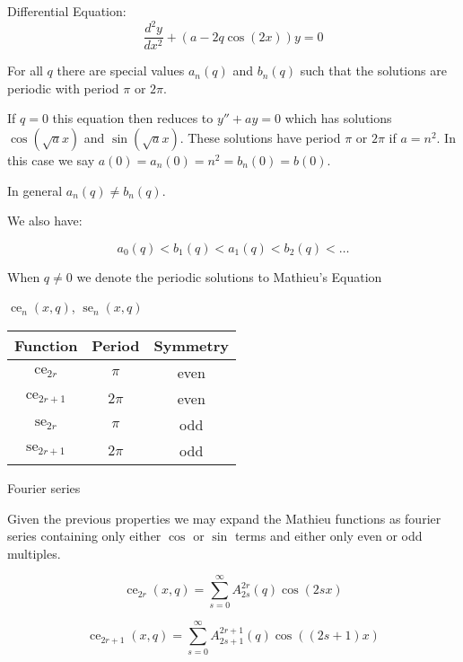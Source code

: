\documentclass{article}
\DeclareMathOperator{\ce}{ce}
\DeclareMathOperator{\se}{se}
\begin{document}
Differential Equation:
\begin{equation}
    \frac{d^2y}{dx^2} + (a - 2q\cos(2x))y = 0
\end{equation}

For all $q$ there are special values $a_n(q)$ and $b_n(q)$ such that the solutions are periodic with period $\pi$ or $2\pi$.

If $q=0$ this equation then reduces to $y'' + ay = 0$ which has solutions $\cos(\sqrt{a}x)$ and $\sin(\sqrt{a}x)$. These solutions have period $\pi$ or $2\pi$ if $a = n^2$. In this case we say $a(0) = a_n(0) = n^2 = b_n(0)=b(0)$. 

In general $a_n(q) \neq b_n(q)$.

We also have:

\begin{equation}
    a_0(q) < b_1(q) < a_1(q) < b_2(q) < \dots
\end{equation}

When $q \neq 0$ we denote the periodic solutions to Mathieu's Equation
\begin{center}
    $\ce_n(x, q)$, $\se_n(x, q)$   
\end{center}

\begin{center}
    \begin{tabular}{|c|c|c|}
    \hline
    Function & Period & Symmetry \\ \hline
    $\ce_{2r}$ & $\pi$ & even \\ \hline
    $\ce_{2r+1}$ & $2\pi$ & even \\ \hline
    $\se_{2r}$ & $\pi$ & odd \\ \hline
    $\se_{2r+1}$ & $2\pi$ & odd \\ \hline
    \end{tabular}
\end{center}

Fourier series

Given the previous properties we may expand the Mathieu functions as fourier series containing only either $\cos$ or $\sin$ terms and either only even or odd multiples.

\begin{equation}
    \ce_{2r}(x, q) = \sum_{s=0}^{\infty}{A_{2s}^{2r}(q)\cos(2sx)}
\end{equation}

\begin{equation}
    \ce_{2r+1}(x, q) = \sum_{s=0}^{\infty}{A_{2s+1}^{2r+1}(q)\cos((2s+1)x)}
\end{equation}
\end{document}
